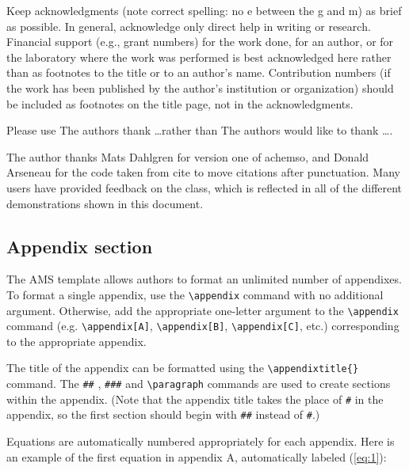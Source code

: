 \documentclass[draft]{ametsoc}
\begin{document}
\acknowledgments

Keep acknowledgments (note correct spelling: no e between the g and m)
as brief as possible. In general, acknowledge only direct help in
writing or research. Financial support (e.g., grant numbers) for the
work done, for an author, or for the laboratory where the work was
performed is best acknowledged here rather than as footnotes to the
title or to an author's name. Contribution numbers (if the work has been
published by the author's institution or organization) should be
included as footnotes on the title page, not in the acknowledgments.

Please use The authors thank \ldots rather than The authors would like
to thank \ldots.

The author thanks Mats Dahlgren for version one of \textsf{achemso}, and
Donald Arseneau for the code taken from \textsf{cite} to move citations
after punctuation. Many users have provided feedback on the class, which
is reflected in all of the different demonstrations shown in this
document.

\appendix[A]


\hypertarget{appendix-section}{%
\subsection{Appendix section}\label{appendix-section}}

The AMS template allows authors to format an unlimited number of
appendixes. To format a single appendix, use the
\texttt{\textbackslash{}appendix} command with no additional argument.
Otherwise, add the appropriate one-letter argument to the
\texttt{\textbackslash{}appendix} command (e.g.
\texttt{\textbackslash{}appendix{[}A{]}},
\texttt{\textbackslash{}appendix{[}B{]}},
\texttt{\textbackslash{}appendix{[}C{]}}, etc.) corresponding to the
appropriate appendix.

The title of the appendix can be formatted using the
\texttt{\textbackslash{}appendixtitle\{\}} command. The \texttt{\#\#} ,
\texttt{\#\#\#} and \texttt{\textbackslash{}paragraph} commands are used
to create sections within the appendix. (Note that the appendix title
takes the place of \texttt{\#} in the appendix, so the first section
should begin with \texttt{\#\#} instead of \texttt{\#}.)

Equations are automatically numbered appropriately for each appendix.
Here is an example of the first equation in appendix A, automatically
labeled (\ref{eq:1}):
\end{document}
